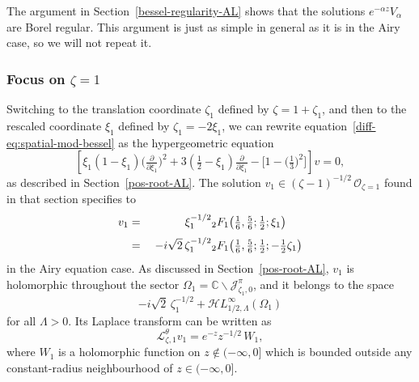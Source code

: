 \documentclass{article}
\newcommand{\singexp}[2]{\mathcal{H}L^\infty_{#1, #2}}
\newcommand{\C}{\mathbb{C}}
\newcommand{\laplace}{\mathcal{L}}
\theoremstyle{definition}
\theoremstyle{plain}
\begin{document}
The argument in Section~\ref{bessel-regularity-AL} shows that the solutions $e^{-\alpha z} V_\alpha$ are Borel regular. This argument is just as simple in general as it is in the Airy case, so we will not repeat it.
%
\subsubsection{Focus on $\zeta = 1$}\label{pos-root}
%
Switching to the translation coordinate $\zeta_1$ defined by $\zeta = 1 + \zeta_1$, and then to the rescaled coordinate $\xi_1$ defined by $\zeta_1 = -2\xi_1$, we can rewrite equation~\eqref{diff-eq:spatial-mod-bessel} as the hypergeometric equation
\begin{equation}%
\left[\xi_1 (1 - \xi_1) \big(\tfrac{\partial}{\partial \xi_1}\big)^2 + 3(\tfrac{1}{2} - \xi_1) \tfrac{\partial}{\partial \xi_1} - \big[1 - \big(\tfrac{1}{3}\big)^2\big]\right] v = 0,
\end{equation}
as described in Section~\ref{pos-root-AL}. The solution $v_1 \in (\zeta-1)^{-1/2}\,\mathcal{O}_{\zeta=1}$ found in that section specifies to
\begin{alignat*}{2}
v_1 &=\;& \hphantom{-i\sqrt{2}}\,\xi_1^{-1/2} & {}_2F_1\big(\tfrac{1}{6}, \tfrac{5}{6}; \tfrac{1}{2}; \xi_1\big) \\[1mm]
&=\;& -i\sqrt{2}\,\zeta_1^{-1/2} & {}_2F_1\big(\tfrac{1}{6}, \tfrac{5}{6}; \tfrac{1}{2}; -\tfrac{1}{2}\zeta_1\big)
\end{alignat*}
in the Airy equation case. As discussed in Section~\ref{pos-root-AL}, $v_1$ is holomorphic throughout the sector $\Omega_1 = \C \smallsetminus \mathcal{J}^\pi_{\zeta_1, 0}$, and it belongs to the space
\[ -i\sqrt{2}\,\zeta_1^{-1/2} + \singexp{1/2}{\Lambda}(\Omega_1) \]
for all $\Lambda > 0$. Its Laplace transform can be written as
\[ \laplace^\theta_{\zeta, 1} v_1 = e^{-z} z^{-1/2}\,W_1, \]
where $W_1$ is a holomorphic function on $z \notin (-\infty, 0]$ which is bounded outside any constant-radius neighbourhood of $z \in (-\infty, 0]$.
%
\end{document}
